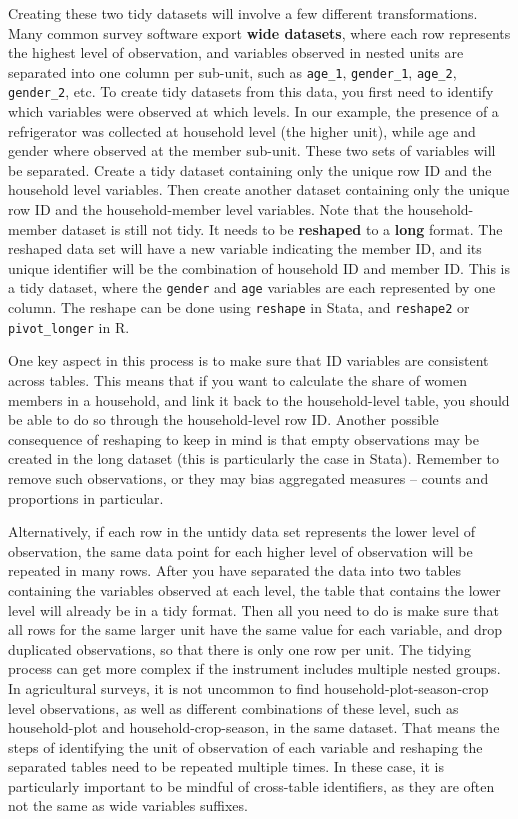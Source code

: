 Creating these two tidy datasets will involve a few different transformations.
Many common survey software export \textbf{wide datasets},
where each row represents the highest level of observation,
and variables observed in nested units are separated into one column per sub-unit,
such as \texttt{age\_1}, \texttt{gender\_1}, \texttt{age\_2}, \texttt{gender\_2}, etc.
To create tidy datasets from this data,
you first need to identify which variables were observed at which levels.
In our example, the presence of a refrigerator was collected at household level (the higher unit),
while age and gender where observed at the member sub-unit.
These two sets of variables will be separated.
Create a tidy dataset containing only the unique row ID and the household level variables.
Then create another dataset containing only the unique row ID and the household-member level variables.
Note that the household-member dataset is still not tidy.
It needs to be \textbf{reshaped}
to a \textbf{long} format.
The reshaped data set will have a new variable indicating the member ID,
and its unique identifier will be the combination of household ID and member ID.
This is a tidy dataset, where
the \texttt{gender} and \texttt{age} variables are each represented by one column.
The reshape can be done using \texttt{reshape} in Stata, and \texttt{reshape2} or \texttt{pivot\_longer} in R.

One key aspect in this process is to make sure that ID variables are consistent across tables.
This means that if you want to calculate the share of women members in a household,
and link it back to the household-level table, 
you should be able to do so through the household-level row ID.
Another possible consequence of reshaping to keep in mind is that
empty observations may be created in the long dataset
(this is particularly the case in Stata).
Remember to remove such observations,
or they may bias aggregated measures --
counts and proportions in particular.

Alternatively, if each row in the untidy data set represents the lower level of observation,
the same data point for each higher level of observation will be repeated in many rows.
After you have separated the data into two tables containing the variables observed at each level,
the table that contains the lower level will already be in a tidy format.
Then all you need to do is make sure that 
all rows for the same larger unit have the same value for each variable,
and drop duplicated observations,
so that there is only one row per unit.
The tidying process can get more complex if the instrument includes multiple nested groups.
In agricultural surveys, it is not uncommon to find household-plot-season-crop level observations,
as well as different combinations of these level,
such as household-plot and household-crop-season, in the same dataset.
That means the steps of identifying the unit of observation of each variable
and reshaping the separated tables need to be repeated multiple times.
In these case, it is particularly important to be mindful of cross-table identifiers,
as they are often not the same as wide variables suffixes.

